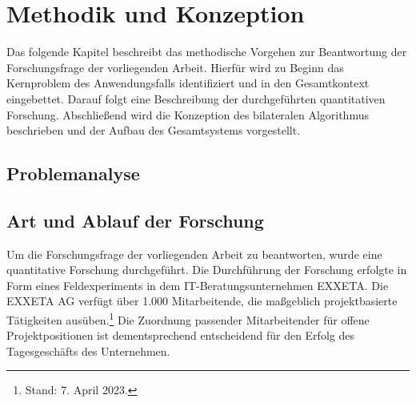 
\chapter{Methodik und Konzeption}
\label{ch:methodik}
Das folgende Kapitel beschreibt das methodische Vorgehen zur Beantwortung der Forschungsfrage der vorliegenden Arbeit.
Hierfür wird zu Beginn das Kernproblem des Anwendungsfalls identifiziert und in den Gesamtkontext eingebettet.
Darauf folgt eine Beschreibung der durchgeführten quantitativen Forschung.
Abschließend wird die Konzeption des bilateralen Algorithmus beschrieben und der Aufbau des Gesamtsystems vorgestellt.

\section{Problemanalyse}



\section{Art und Ablauf der Forschung}
Um die Forschungsfrage der vorliegenden Arbeit zu beantworten, wurde eine quantitative Forschung durchgeführt.
Die Durchführung der Forschung erfolgte in Form eines Feldexperiments in dem IT-Beratungsunternehmen EXXETA.
Die EXXETA AG verfügt über 1.000 Mitarbeitende, die maßgeblich projektbasierte Tätigkeiten ausüben.\footnote{Stand: 7. April 2023.}
Die Zuordnung passender Mitarbeitender für offene Projektpositionen ist dementsprechend entscheidend für den Erfolg des Tagesgeschäfts des Unternehmen.

